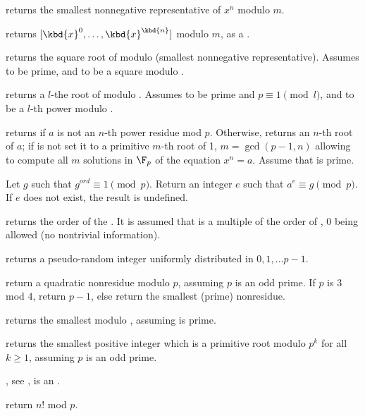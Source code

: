  returns the smallest
nonnegative representative of $x^n$ modulo $m$.

 returns
$[\kbd{x}^0, \dots, \kbd{x}^\kbd{n}]$ modulo $m$, as a .

 returns the square root of 
modulo  (smallest nonnegative representative). Assumes  to be
prime, and  to be a square modulo .

 returns a $l$-the root of 
modulo . Assumes  to be prime and $p \equiv 1 \pmod{l}$, and
 to be a $l$-th power modulo .

returns  if $a$ is not an $n$-th power residue mod $p$.
Otherwise, returns an $n$-th root of $a$; if  is not 
set it to a primitive $m$-th root of 1, $m = \gcd(p-1,n)$ allowing to compute
all $m$ solutions in $\F_p$ of the equation $x^n = a$. Assume that 
is prime.

 Let $g$ such that
$g^{ord} \equiv 1 \pmod{p}$. Return an integer $e$ such that
$a^e \equiv g \pmod{p}$. If $e$ does not exist, the result is undefined.

 returns the order of the
 . It is assumed that  is a multiple of the order of
, $0$ being allowed (no nontrivial information).

 returns a pseudo-random integer uniformly
distributed in $0, 1, \dots p-1$.

 return a quadratic nonresidue modulo $p$,
assuming $p$ is an odd prime. If $p$ is $3$ mod $4$, return $p-1$, else
return the smallest (prime) nonresidue.

 returns the smallest 
modulo , assuming  is prime.

 returns the smallest positive integer which is
a primitive root modulo $p^k$ for all $k \ge 1$, assuming $p$ is an odd prime.

, see ,
 is an .

 return $n!$ mod $p$.

